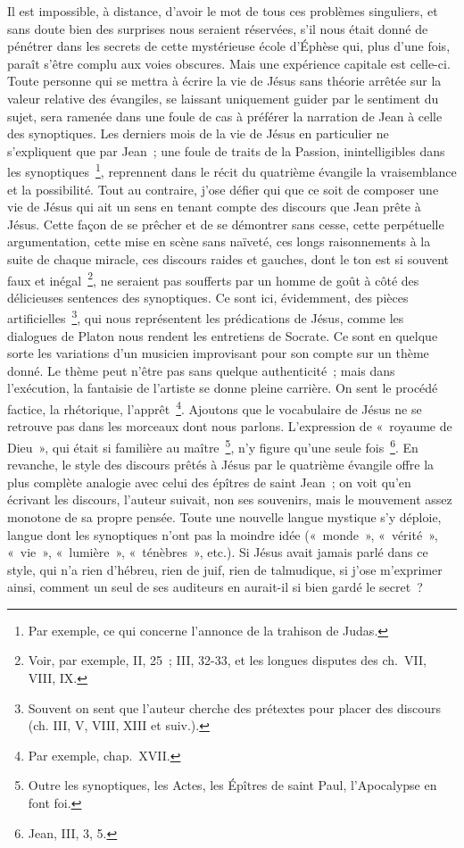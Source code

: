 \documentclass[french,twoside]{book} %
\begin{document}
Il est impossible, à distance, d’avoir le mot de tous ces problèmes singuliers, et sans doute bien des surprises nous seraient réservées, s’il nous était donné de pénétrer dans les secrets de cette mystérieuse école d’Éphèse qui, plus d’une fois, paraît s’être complu aux voies obscures. Mais une expérience capitale est celle-ci. Toute personne qui se mettra à écrire la vie de Jésus sans théorie arrêtée sur la valeur relative des évangiles, se laissant uniquement guider par le sentiment du sujet, sera ramenée dans une foule de cas à préférer la narration de Jean à celle des synoptiques. Les derniers mois de la vie de Jésus en particulier ne s’expliquent que par Jean ; une foule de traits de la Passion, inintelligibles dans les synoptiques \footnote{Par exemple, ce qui concerne l’annonce de la trahison de Judas.}, reprennent dans le récit du quatrième évangile la vraisemblance et la possibilité. Tout au contraire, j’ose défier qui que ce soit de composer une vie de Jésus qui ait un sens en tenant compte des discours que Jean prête à Jésus. Cette façon de se prêcher et de se démontrer sans cesse, cette perpétuelle argumentation, cette mise en scène sans naïveté, ces longs raisonnements à la suite de chaque miracle, ces discours raides et gauches, dont le ton est si souvent faux et inégal \footnote{Voir, par exemple, II, 25 ; III, 32-33, et les longues disputes des ch. VII, VIII, IX.}, ne seraient pas soufferts par un homme de goût à côté des délicieuses sentences des synoptiques. Ce sont ici, évidemment, des pièces artificielles \footnote{Souvent on sent que l’auteur cherche des prétextes pour placer des discours (ch. III, V, VIII, XIII et suiv.).}, qui nous représentent les prédications de Jésus, comme les dialogues de Platon nous rendent les entretiens de Socrate. Ce sont en quelque sorte les variations d’un musicien improvisant pour son compte sur un thème donné. Le thème peut n’être pas sans quelque authenticité ; mais dans l’exécution, la fantaisie de l’artiste se donne pleine carrière. On sent le procédé factice, la rhétorique, l’apprêt \footnote{Par exemple, chap. XVII.}. Ajoutons que le vocabulaire de Jésus ne se retrouve pas dans les morceaux dont nous parlons. L’expression de « royaume de Dieu », qui était si familière au maître \footnote{Outre les synoptiques, les Actes, les Épîtres de saint Paul, l’Apocalypse en font foi.}, n’y figure qu’une seule fois \footnote{Jean, III, 3, 5.}. En revanche, le style des discours prêtés à Jésus par le quatrième évangile offre la plus complète analogie avec celui des épîtres de saint Jean ; on voit qu’en écrivant les discours, l’auteur suivait, non ses souvenirs, mais le mouvement assez monotone de sa propre pensée. Toute une nouvelle langue mystique s’y déploie, langue dont les synoptiques n’ont pas la moindre idée (« monde », « vérité », « vie », « lumière », « ténèbres », etc.). Si Jésus avait jamais parlé dans ce style, qui n’a rien d’hébreu, rien de juif, rien de talmudique, si j’ose m’exprimer ainsi, comment un seul de ses auditeurs en aurait-il si bien gardé le secret ?\par
\end{document}

